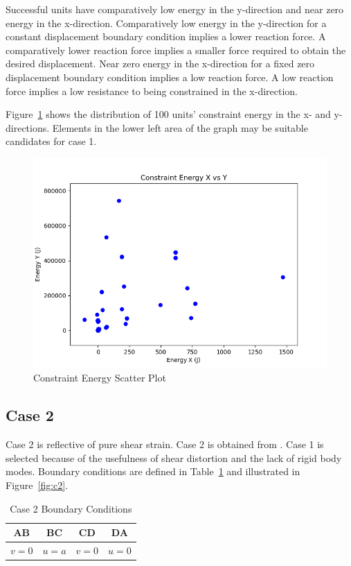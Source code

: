 Successful units have comparatively low energy in the y-direction and near zero energy in the x-direction. Comparatively low energy in the y-direction for a constant displacement boundary condition implies a lower reaction force. A comparatively lower reaction force implies a smaller force required to obtain the desired displacement. Near zero energy in the x-direction for a fixed zero displacement boundary condition implies a low reaction force. A low reaction force implies a low resistance to being constrained in the x-direction.

Figure~\ref{fig:cesp} shows the distribution of 100 units' constraint energy in the x- and y-directions. Elements in the lower left area of the graph may be suitable candidates for case 1.

\begin{figure}[H]
	\centering
	\includegraphics[width=1\textwidth]{c_e_x_vs_y.png}
	\caption{Constraint Energy Scatter Plot}
	\label{fig:cesp}
\end{figure}

\subsection{Case 2}

Case 2 is reflective of pure shear strain. Case 2 is obtained from \cite{Cook2002}. Case 1 is selected because of the usefulness of shear distortion and the lack of rigid body modes. Boundary conditions are defined in Table~\ref{tab:c2bc} and illustrated in Figure~\ref{fig:c2}.

\begin{table}[H]
\centering
\caption{Case 2 Boundary Conditions \cite{Cook2002}}
\label{tab:c2bc}
\begin{tabular}{lccc}
\hline
\multicolumn{1}{c}{\textbf{AB}} & \textbf{BC}               & \textbf{CD}               & \textbf{DA}               \\ \hline
$v=0$                           & \multicolumn{1}{r}{$u=a$} & \multicolumn{1}{r}{$v=0$} & \multicolumn{1}{r}{$u=0$} \\ \hline
\end{tabular}
\end{table}

